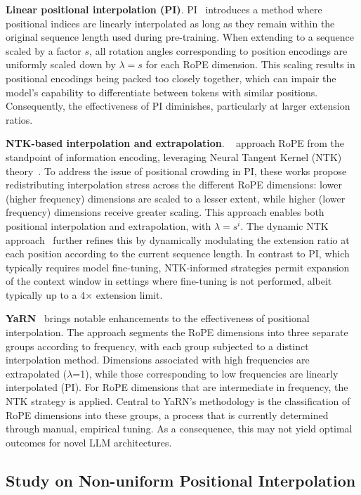 \textbf{Linear positional interpolation (PI)}. PI~\cite{pi} introduces a method where positional indices are linearly interpolated as long as they remain within the original sequence length used during pre-training. When extending to a sequence scaled by a factor $s$, all rotation angles corresponding to position encodings are uniformly scaled down by $\lambda = s$ for each RoPE dimension. This scaling results in positional encodings being packed too closely together, which can impair the model’s capability to differentiate between tokens with similar positions. Consequently, the effectiveness of PI diminishes, particularly at larger extension ratios.

\textbf{NTK-based interpolation and extrapolation}. ~\cite{ntk,dynamicntk} approach RoPE from the standpoint of information encoding, leveraging Neural Tangent Kernel (NTK) theory~\cite{jacot2018neural,tancik2020fourier}. To address the issue of positional crowding in PI, these works propose redistributing interpolation stress across the different RoPE dimensions: lower (higher frequency) dimensions are scaled to a lesser extent, while higher (lower frequency) dimensions receive greater scaling. This approach enables both positional interpolation and extrapolation, with $\lambda=s^{i}$. The dynamic NTK approach~\cite{dynamicntk} further refines this by dynamically modulating the extension ratio at each position according to the current sequence length. In contrast to PI, which typically requires model fine-tuning, NTK-informed strategies permit expansion of the context window in settings where fine-tuning is not performed, albeit typically up to a 4$\times$ extension limit.

\textbf{YaRN}~\cite{yarn} brings notable enhancements to the effectiveness of positional interpolation. The approach segments the RoPE dimensions into three separate groups according to frequency, with each group subjected to a distinct interpolation method. Dimensions associated with high frequencies are extrapolated ($\lambda$=1), while those corresponding to low frequencies are linearly interpolated (PI). For RoPE dimensions that are intermediate in frequency, the NTK strategy is applied. Central to YaRN's methodology is the classification of RoPE dimensions into these groups, a process that is currently determined through manual, empirical tuning. As a consequence, this may not yield optimal outcomes for novel LLM architectures.

\subsection{Study on Non-uniform Positional Interpolation}

